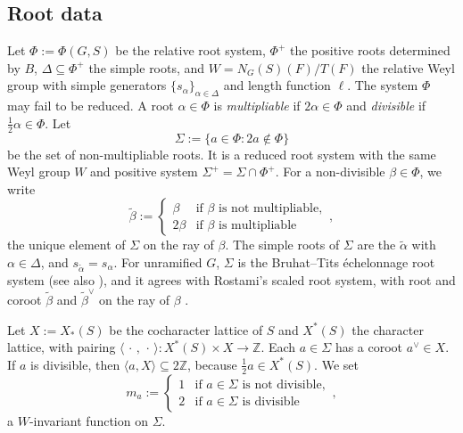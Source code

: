 \documentclass[12pt]{article}
\numberwithin{equation}{section}
\theoremstyle{definition}
\theoremstyle{remark}
\theoremstyle{plain}
\begin{document}
\subsection{Root data}
Let $\Phi := \Phi(G,S)$ be the relative root system, $\Phi^+$ the positive roots determined by $B$, $\Delta \subseteq \Phi^+$ the simple roots, and $W = N_G(S)(F)/T(F)$ the relative Weyl group with simple generators $\{s_\alpha\}_{\alpha\in\Delta}$ and length function $\ell$. The system $\Phi$ may fail to be reduced. A root $\alpha \in \Phi$ is \emph{multipliable} if $2\alpha \in \Phi$ and \emph{divisible} if $\tfrac{1}{2}\alpha \in \Phi$. Let
$$\Sigma := \{a \in \Phi : 2a \notin \Phi\}$$
be the set of non-multipliable roots. It is a reduced root system with the same Weyl group $W$ and positive system $\Sigma^+ = \Sigma \cap \Phi^+$. For a non-divisible $\beta \in \Phi$, we write
$$\tilde{\beta} := \begin{cases}\beta & \text{if } \beta \text{ is not multipliable},\\ 2\beta & \text{if } \beta \text{ is multipliable}\end{cases},$$
the unique element of $\Sigma$ on the ray of $\beta$. The simple roots of $\Sigma$ are the $\tilde\alpha$ with $\alpha \in \Delta$, and $s_{\tilde\alpha} = s_\alpha$. For unramified $G$, $\Sigma$ is the Bruhat--Tits \'echelonnage root system \cite[Theorem 6.3]{Haines18} (see also \cite[Section 4]{Tits}), and it agrees with Rostami's scaled root system, with root and coroot $\tilde\beta$ and $\tilde\beta^\vee$ on the ray of $\beta$ \cite[Section 3.3]{Rostami}.

Let $X := X_*(S)$ be the cocharacter lattice of $S$ and $X^*(S)$ the character lattice, with pairing $\langle\,\cdot\,,\,\cdot\,\rangle : X^*(S) \times X \to \mathbb{Z}$. Each $a \in \Sigma$ has a coroot $a^\vee \in X$. If $a$ is divisible, then $\langle a, X\rangle \subseteq 2\mathbb{Z}$, because $\tfrac{1}{2}a \in X^*(S)$. We set
$$m_a := \begin{cases} 1 & \text{if } a \in \Sigma \text{ is not divisible},\\ 2 & \text{if } a \in \Sigma \text{ is divisible}\end{cases},$$
a $W$-invariant function on $\Sigma$.
\end{document}
